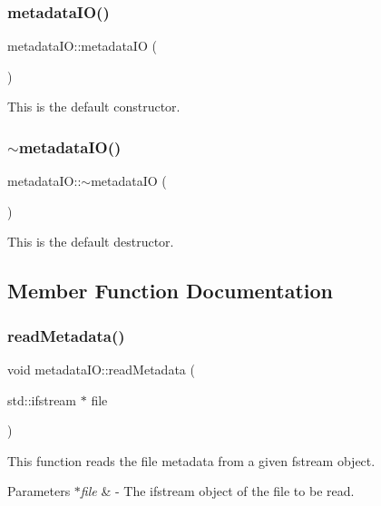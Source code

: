 \subsubsection{\texorpdfstring{metadata\+I\+O()}{metadataIO()}}
{\footnotesize\ttfamily metadata\+I\+O\+::metadata\+IO (\begin{DoxyParamCaption}{ }\end{DoxyParamCaption})}

This is the default constructor. \mbox{\label{classmetadataIO_afe6677b6e0070294bd78aef91a14c381}} 
\subsubsection{\texorpdfstring{$\sim$metadata\+I\+O()}{~metadataIO()}}
{\footnotesize\ttfamily metadata\+I\+O\+::$\sim$metadata\+IO (\begin{DoxyParamCaption}{ }\end{DoxyParamCaption})}

This is the default destructor. 

\subsection{Member Function Documentation}
\mbox{\label{classmetadataIO_a453fa191b3706e946f6b63c82ee5741b}} 
\subsubsection{\texorpdfstring{read\+Metadata()}{readMetadata()}}
{\footnotesize\ttfamily void metadata\+I\+O\+::read\+Metadata (\begin{DoxyParamCaption}\item[{std\+::ifstream $\ast$}]{file }\end{DoxyParamCaption})}

This function reads the file metadata from a given fstream object. 
\begin{DoxyParams}{Parameters}
{\em $\ast$file} & -\/ The ifstream object of the file to be read. \\
\hline
\end{DoxyParams}
\mbox{\label{classmetadataIO_a25d23857ece64de3a376fa9f26d66577}} 
